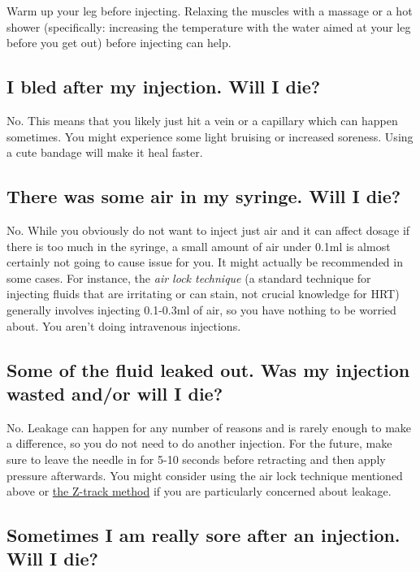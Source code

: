 \documentclass{article}
\begin{document}
Warm up your leg before injecting. Relaxing the muscles with a massage or a hot shower (specifically: increasing the temperature with the water aimed at your leg before you get out) before injecting can help.

\subsection{I bled after my injection. Will I die?}

No. This means that you likely just hit a vein or a capillary which can happen sometimes. You might experience some light bruising or increased soreness. Using a cute bandage will make it heal faster.

\subsection{There was some air in my syringe. Will I die?}\label{7-7}

No. While you obviously do not want to inject just air and it can affect dosage if there is too much in the syringe, a small amount of air under 0.1ml is almost certainly not going to cause issue for you. It might actually be recommended in some cases. For instance, the \textit{air lock technique} (a standard technique for injecting fluids that are irritating or can stain, not crucial knowledge for HRT) generally involves injecting 0.1-0.3ml of air, so you have nothing to be worried about. You aren’t doing intravenous injections.

\subsection{Some of the fluid leaked out. Was my injection wasted and/or will I die?}

No. Leakage can happen for any number of reasons and is rarely enough to make a difference, so you do not need to do another injection. For the future, make sure to leave the needle in for 5-10 seconds before retracting and then apply pressure afterwards. You might consider using the air lock technique mentioned above or \href{https://www.nurse.com/nursing-resources/definitions/what-is-z-track-method/}{the Z-track method} if you are particularly concerned about leakage.

\subsection{Sometimes I am really sore after an injection. Will I die?}
\end{document}
